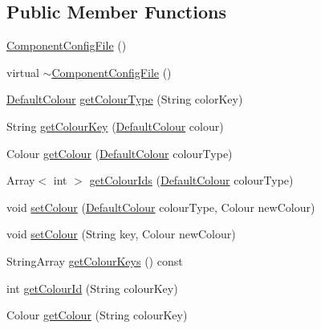 \subsection*{Public Member Functions}
\begin{DoxyCompactItemize}
\item 
\mbox{\hyperlink{classComponentConfigFile_a304974fc0520848aa84a3141a3521fbb}{Component\+Config\+File}} ()
\item 
virtual \mbox{\hyperlink{classComponentConfigFile_a2ae01b7e47e86976baee8326db9de17c}{$\sim$\+Component\+Config\+File}} ()
\item 
\mbox{\hyperlink{classComponentConfigFile_a9bf86058d7f64d6ba94770c3dbf3cad8}{Default\+Colour}} \mbox{\hyperlink{classComponentConfigFile_a4a82c4e5eedd8ee0128e4e4074a84f8a}{get\+Colour\+Type}} (String color\+Key)
\item 
String \mbox{\hyperlink{classComponentConfigFile_a96867166b573ab6d14d343d45ee7d51e}{get\+Colour\+Key}} (\mbox{\hyperlink{classComponentConfigFile_a9bf86058d7f64d6ba94770c3dbf3cad8}{Default\+Colour}} colour)
\item 
Colour \mbox{\hyperlink{classComponentConfigFile_a1219b2ee65746b2dc044b2309da91544}{get\+Colour}} (\mbox{\hyperlink{classComponentConfigFile_a9bf86058d7f64d6ba94770c3dbf3cad8}{Default\+Colour}} colour\+Type)
\item 
Array$<$ int $>$ \mbox{\hyperlink{classComponentConfigFile_ae2d37902d4153dd9b8f31418955c991f}{get\+Colour\+Ids}} (\mbox{\hyperlink{classComponentConfigFile_a9bf86058d7f64d6ba94770c3dbf3cad8}{Default\+Colour}} colour\+Type)
\item 
void \mbox{\hyperlink{classComponentConfigFile_a2afa7e95d450f22c91cde28e909fb0b1}{set\+Colour}} (\mbox{\hyperlink{classComponentConfigFile_a9bf86058d7f64d6ba94770c3dbf3cad8}{Default\+Colour}} colour\+Type, Colour new\+Colour)
\item 
void \mbox{\hyperlink{classComponentConfigFile_afa051342de6ce64f115df2528b48663b}{set\+Colour}} (String key, Colour new\+Colour)
\item 
String\+Array \mbox{\hyperlink{classComponentConfigFile_af3ca8de8ed548f662eaf07c59cd4abe9}{get\+Colour\+Keys}} () const
\item 
int \mbox{\hyperlink{classComponentConfigFile_aa87c850a6381399fcbf9242522c9a65a}{get\+Colour\+Id}} (String colour\+Key)
\item 
Colour \mbox{\hyperlink{classComponentConfigFile_aad2b82f6ff6f0883cdf3a54d4869e8e4}{get\+Colour}} (String colour\+Key)
\item 

\end{DoxyCompactItemize}
